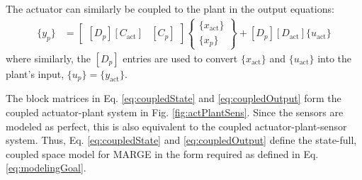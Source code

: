 The actuator can similarly be coupled to the plant in the output equations:
\begin{align}
	\label{eq:coupledOutput}
	\{y_p\} &= \begin{bmatrix}
		[D_p][C_\text{act}] & [C_p]
	\end{bmatrix} \begin{Bmatrix} \{x_\text{act}\} \\ \{x_p\} \end{Bmatrix}
	+ [D_p] [D_\text{act}] \{u_\text{act}\}
\end{align}
where similarly, the $[D_p]$ entries are used to convert $\{x_\text{act}\}$ and $\{u_\text{act}\}$ into the plant's input, $\{u_p\}=\{y_\text{act}\}$.

The block matrices in Eq. \ref{eq:coupledState} and \ref{eq:coupledOutput} form the coupled actuator-plant system in Fig. \ref{fig:actPlantSens}. Since the sensors are modeled as perfect, this is also equivalent to the coupled actuator-plant-sensor system. Thus, Eq. \ref{eq:coupledState} and \ref{eq:coupledOutput} define the state-full, coupled space model for MARGE in the form required as defined in Eq. \ref{eq:modelingGoal}.